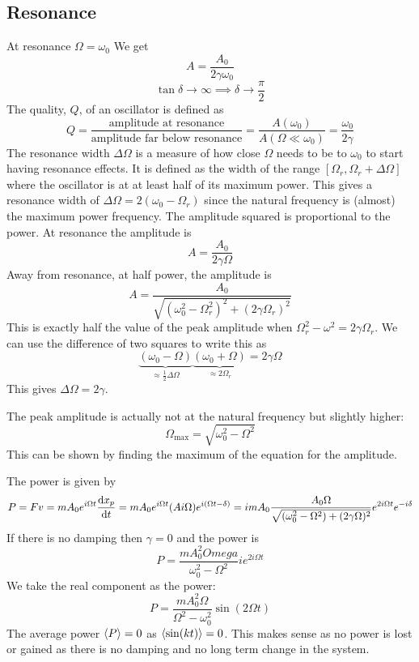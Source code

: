 \documentclass{article}
\begin{document}
    \subsection{Resonance}
    At resonance \(\Omega = \omega_0\) We get
    \[A = \frac{A_0}{2\gamma\omega_0}\]
    \[\tan\delta\to\infty\implies\delta\to\frac{\pi}{2}\]
    The quality, \(Q\), of an oscillator is defined as
    \[Q = \frac{\text{amplitude at resonance}}{\text{amplitude far below resonance}} = \frac{A(\omega_0)}{A(\Omega\ll\omega_0)} = \frac{\omega_0}{2\gamma}\]
    The resonance width \(\Delta\Omega\) is a measure of how close \(\Omega\) needs to be to \(\omega_0\) to start having resonance effects.
    It is defined as the width of the range \([\Omega_r, \Omega_r+ \Delta\Omega]\) where the oscillator is at at least half of its maximum power.
    This gives a resonance width of \(\Delta\Omega = 2(\omega_0 - \Omega_r)\) since the natural frequency is (almost) the maximum power frequency.
    The amplitude squared is proportional to the power.
    At resonance the amplitude is
    \[A = \frac{A_0}{2\gamma\Omega}\]
    Away from resonance, at half power, the amplitude is
    \[A = \frac{A_0}{\sqrt{(\omega_0^2 - \Omega_r^2)^2 + (2\gamma\Omega_r)^2}}\]
    This is exactly half the value of the peak amplitude when \(\Omega_r^2 - \omega^2 = 2\gamma\Omega_r\).
    We can use the difference of two squares to write this as
    \[\underbrace{(\omega_0 - \Omega)}_{\approx \frac{1}{2}\Delta \Omega}\underbrace{(\omega_0 + \Omega)}_{\approx 2\Omega_r} = 2\gamma\Omega\]
    This gives \(\Delta\Omega = 2\gamma\).
    
    The peak amplitude is actually not at the natural frequency but slightly higher:
    \[\Omega_\text{max} = \sqrt{\omega_0^2 - \Omega^2}\]
    This can be shown by finding the maximum of the equation for the amplitude.
    
    The power is given by
    \[P = Fv = mA_0e^{i\Omega t}\dv{x_p}{t} = mA_0e^{i\Omega t}(Ai\Omega)e^{i(\Omega t - \delta)} = imA_0\frac{A_0\Omega}{\sqrt{(\omega_0^2 - \Omega^2) + (2\gamma\Omega)^2}}e^{2i\Omega t}e^{-i\delta}\]
    If there is no damping then \(\gamma = 0\) and the power is
    \[P = \frac{mA_0^2Omega}{\omega_0^2 - \Omega^2}ie^{2i\Omega t}\]
    We take the real component as the power:
    \[P = \frac{mA_0^2\Omega}{\Omega^2 - \omega_0^2}\sin(2\Omega t)\]
    The average power \(\left\langle{P}\right\rangle = 0\) as \(\left\langle{\sin(kt)}\right\rangle = 0\).
    This makes sense as no power is lost or gained as there is no damping and no long term change in the system.
    
\end{document}
